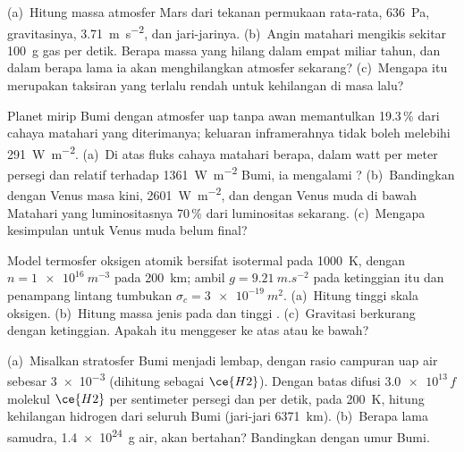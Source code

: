 \begin{exercise}[$\star\star$]\label{exo:b3:planetary-atmospheres:8}
(a)~Hitung massa atmosfer Mars dari tekanan permukaan rata-rata,
\qty{636}{Pa}, gravitasinya, \qty{3.71}{m.s^{-2}}, dan jari-jarinya.
(b)~Angin matahari mengikis sekitar \qty{100}{g} gas per detik.
Berapa massa yang hilang dalam empat miliar tahun, dan dalam berapa lama ia akan menghilangkan atmosfer sekarang?
(c)~Mengapa itu merupakan taksiran yang terlalu rendah untuk
kehilangan di masa lalu?
\end{exercise}

\begin{exercise}[$\star\star$]\label{exo:b3:planetary-atmospheres:9}
Planet mirip Bumi dengan atmosfer uap tanpa awan memantulkan 19.3\,\%
dari cahaya matahari yang diterimanya; keluaran inframerahnya tidak boleh melebihi
\qty{291}{W.m^{-2}}. (a)~Di atas fluks cahaya matahari berapa, dalam watt per
meter persegi dan relatif terhadap \qty{1361}{W.m^{-2}} Bumi, ia mengalami ?
(b)~Bandingkan dengan Venus masa kini, \qty{2601}{W.m^{-2}}, dan dengan Venus muda
di bawah Matahari yang luminositasnya 70\,\% dari luminositas sekarang. (c)~Mengapa
kesimpulan untuk Venus muda belum final?
\end{exercise}

\begin{exercise}[$\star\star\star$]\label{exo:b3:planetary-atmospheres:10}
Model termosfer oksigen atomik bersifat isotermal pada \qty{1000}{K}, dengan
$n = \qty{1e16}{m^{-3}}$ pada \qty{200}{km}; ambil $g =
\qty{9.21}{m.s^{-2}}$ pada ketinggian itu dan penampang lintang tumbukan
$\sigma_c = \qty{3e-19}{m^2}$. (a)~Hitung tinggi skala oksigen.
(b)~Hitung massa jenis pada  dan tinggi .
(c)~Gravitasi berkurang dengan ketinggian. Apakah itu menggeser  ke atas atau
ke bawah?
\end{exercise}

\begin{exercise}[$\star\star\star$]\label{exo:b3:planetary-atmospheres:11}
(a)~Misalkan stratosfer Bumi menjadi lembap, dengan rasio campuran
uap air sebesar \num{3e-3} (dihitung sebagai $\ce{H2}$). Dengan batas difusi
$\num{3.0e13}\,f$ molekul $\ce{H2}$ per sentimeter persegi dan
per detik, pada \qty{200}{K}, hitung kehilangan hidrogen dari seluruh
Bumi (jari-jari \qty{6371}{km}). (b)~Berapa lama samudra,
\qty{1.4e24}{g} air, akan bertahan? Bandingkan dengan umur Bumi.
\end{exercise}

